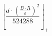 \[\left\lfloor \frac{d \cdot \left(\frac{B \cdot R}{\varepsilon}\right)^{2}}{524288} \right\rfloor_{+}\]
